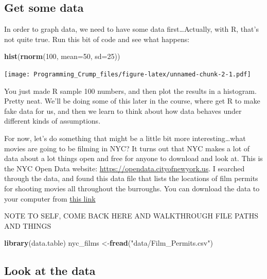 \documentclass[]{book}
\newenvironment{Shaded}{\begin{snugshade}}{\end{snugshade}}
\newcommand{\KeywordTok}[1]{\textcolor[rgb]{0.13,0.29,0.53}{\textbf{{#1}}}}
\newcommand{\DataTypeTok}[1]{\textcolor[rgb]{0.13,0.29,0.53}{{#1}}}
\newcommand{\DecValTok}[1]{\textcolor[rgb]{0.00,0.00,0.81}{{#1}}}
\newcommand{\StringTok}[1]{\textcolor[rgb]{0.31,0.60,0.02}{{#1}}}
\newcommand{\NormalTok}[1]{{#1}}
\theoremstyle{definition}
\theoremstyle{definition}
\theoremstyle{definition}
\theoremstyle{remark}
\begin{document}
\subsection{Get some data}\label{get-some-data}

In order to graph data, we need to have some data first\ldots{}Actually,
with R, that's not quite true. Run this bit of code and see what
happens:

\begin{Shaded}
\begin{Highlighting}[]
\KeywordTok{hist}\NormalTok{(}\KeywordTok{rnorm}\NormalTok{(}\DecValTok{100}\NormalTok{, }\DataTypeTok{mean=}\DecValTok{50}\NormalTok{, }\DataTypeTok{sd=}\DecValTok{25}\NormalTok{))}
\end{Highlighting}
\end{Shaded}

\texttt{[image: Programming\_Crump\_files/figure-latex/unnamed-chunk-2-1.pdf]}

You just made R sample 100 numbers, and then plot the results in a
histogram. Pretty neat. We'll be doing some of this later in the course,
where get R to make fake data for us, and then we learn to think about
how data behaves under different kinds of assumptions.

For now, let's do something that might be a little bit more
interesting\ldots{}what movies are going to be filming in NYC? It turns
out that NYC makes a lot of data about a lot things open and free for
anyone to download and look at. This is the NYC Open Data website:
\url{https://opendata.cityofnewyork.us}. I searched through the data,
and found this data file that lists the locations of film permits for
shooting movies all throughout the burroughs. You can download the data
to your computer from
\href{https://raw.githubusercontent.com/CrumpLab/statisticsLab/master/data/MehrSongSpelke2016.csv}{this
link}

NOTE TO SELF, COME BACK HERE AND WALKTHROUGH FILE PATHS AND THINGS

\begin{Shaded}
\begin{Highlighting}[]
\KeywordTok{library}\NormalTok{(data.table)}
\NormalTok{nyc_films <-}\KeywordTok{fread}\NormalTok{(}\StringTok{"data/Film_Permits.csv"}\NormalTok{)}
\end{Highlighting}
\end{Shaded}

\subsection{Look at the data}\label{look-at-the-data}
\end{document}
